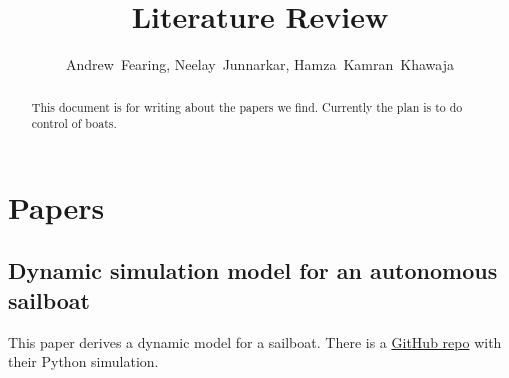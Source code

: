 \documentclass[conference]{IEEEtran}
\begin{document}
\title{Literature Review}
\author{Andrew~Fearing, Neelay~Junnarkar,  Hamza~Kamran~Khawaja}
\maketitle

\begin{abstract}
This document is for writing about the papers we find. Currently the plan is to do control of boats.
\end{abstract}

\section{Papers}
\subsection{Dynamic simulation model for an autonomous sailboat}
\cite{Buehler2018} This paper derives a dynamic model for a sailboat. There is a \href{https://github.com/simonkohaut/stda-sailboat-simulator/tree/master/src}{GitHub repo} with their Python simulation.




\end{document}
